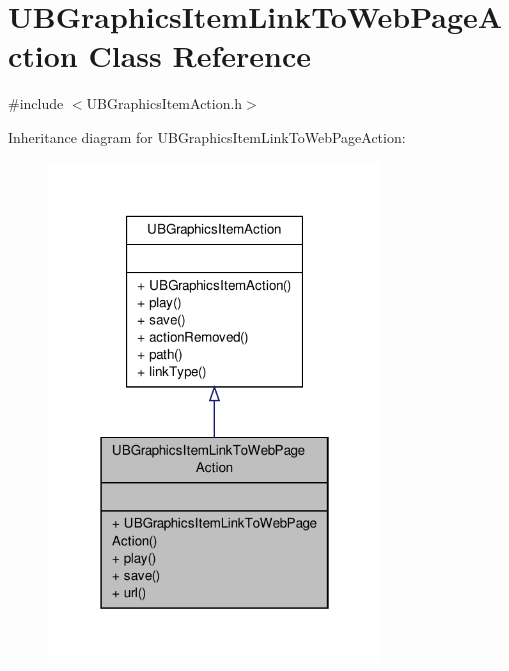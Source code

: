 \hypertarget{class_u_b_graphics_item_link_to_web_page_action}{\section{U\-B\-Graphics\-Item\-Link\-To\-Web\-Page\-Action Class Reference}
\label{d0/d57/class_u_b_graphics_item_link_to_web_page_action}
}


{\ttfamily \#include $<$U\-B\-Graphics\-Item\-Action.\-h$>$}



Inheritance diagram for U\-B\-Graphics\-Item\-Link\-To\-Web\-Page\-Action\-:
\nopagebreak
\begin{figure}[H]
\begin{center}
\leavevmode
\includegraphics[width=250pt]{d5/ddc/class_u_b_graphics_item_link_to_web_page_action__inherit__graph}
\end{center}
\end{figure}


